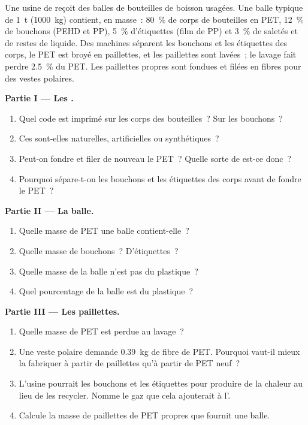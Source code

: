 \begin{problem}
\label{pb:g8:plastics:1}
Une usine de  reçoit des balles de bouteilles de boisson
usagées. Une balle typique de \qty{1}{t} (\qty{1000}{kg}) contient, en
masse~: \qty{80}{\percent} de corps de bouteilles en PET,
\qty{12}{\percent} de bouchons (PEHD et PP), \qty{5}{\percent}
d'étiquettes (film de PP) et \qty{3}{\percent} de saletés et de restes
de liquide. Des machines séparent les bouchons et les étiquettes des
corps, le PET est broyé en paillettes, et les paillettes sont lavées~;
le lavage fait perdre \qty{2.5}{\percent} du PET. Les paillettes
propres sont fondues et filées en fibres pour des vestes polaires.

\medskip
\noindent\textbf{Partie I --- Les .}
\begin{enumerate}
  \item Quel code est imprimé sur les corps des bouteilles~? Sur les
        bouchons~?
  \item Ces  sont-elles naturelles, artificielles ou
        synthétiques~?
  \item Peut-on fondre et filer de nouveau le PET~? Quelle sorte de
         est-ce donc~?
  \item Pourquoi sépare-t-on les bouchons et les étiquettes des corps
        avant de fondre le PET~?
\end{enumerate}

\medskip
\noindent\textbf{Partie II --- La balle.}
\begin{enumerate}[resume]
  \item Quelle masse de PET une balle contient-elle~?
  \item Quelle masse de bouchons~? D'étiquettes~?
  \item Quelle masse de la balle n'est pas du plastique~?
  \item Quel pourcentage de la balle est du plastique~?
\end{enumerate}

\medskip
\noindent\textbf{Partie III --- Les paillettes.}
\begin{enumerate}[resume]
  \item Quelle masse de PET est perdue au lavage~?
  \item Une veste polaire demande \qty{0.39}{kg} de fibre de PET. Pourquoi
        vaut-il mieux la fabriquer à partir de paillettes qu'à partir de
        PET neuf~?
  \item L'usine pourrait  les bouchons et les étiquettes pour
        produire de la chaleur au lieu de les recycler. Nomme le gaz que
        cela ajouterait à l'.
  \item Calcule la masse de paillettes de PET propres que fournit une
        balle.
\end{enumerate}
\end{problem}
